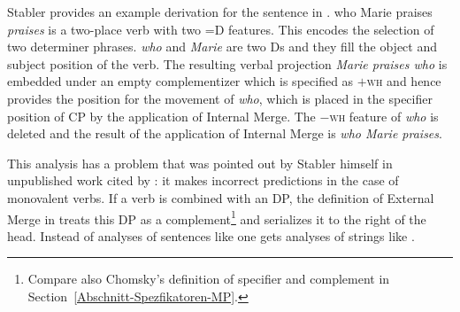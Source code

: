 Stabler provides an example derivation for the sentence in .
\ea
who Marie praises
\z
\emph{praises} is a two-place verb with two =D features. This encodes the selection of two determiner
phrases. \emph{who} and \emph{Marie} are two Ds and they fill the object and subject position of the
verb. The resulting verbal projection \emph{Marie praises who} is embedded under an empty complementizer which is specified
as $+$\textsc{wh} and hence provides the position for the movement of \emph{who}, which is placed in the
specifier position of CP by the application of Internal Merge. The $-$\textsc{wh} feature of \emph{who}
is deleted and the result of the application of Internal Merge is \emph{who Marie praises}.

This\label{Seite-leeres-Objekt} analysis has a problem that was pointed out by Stabler himself in unpublished work cited by
\citet[]{Veenstra98a}: it makes incorrect predictions in the case of monovalent verbs. If
a verb is combined with an DP, the definition of External Merge in 
treats this DP as a complement\footnote{%
Compare also Chomsky's definition of specifier and complement in Section~\ref{Abschnitt-Spezfikatoren-MP}.
} and serializes it to the right of the head. Instead of analyses of sentences like  one
gets analyses of strings like .

